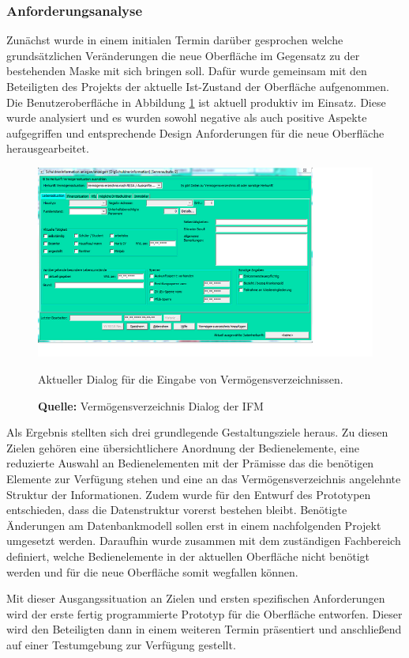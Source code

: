 \subsubsection{Anforderungsanalyse}
Zunächst wurde in einem initialen Termin darüber gesprochen welche grundsätzlichen Veränderungen die neue Oberfläche im Gegensatz zu der bestehenden Maske mit sich bringen soll. Dafür wurde gemeinsam mit den Beteiligten des Projekts der aktuelle Ist-Zustand der Oberfläche aufgenommen. Die Benutzeroberfläche in Abbildung \ref{fig:aktuellerDialog} ist aktuell produktiv im Einsatz. Diese wurde analysiert und es wurden sowohl negative als auch positive Aspekte aufgegriffen und entsprechende Design Anforderungen für die neue Oberfläche herausgearbeitet.
\begin{figure}[H]
  \centering
  \includegraphics[scale=1]{img/aktueller_Dialog.PNG}
  \caption{Aktueller Dialog für die Eingabe von Vermögensverzeichnissen.}
  \caption*{\textbf{Quelle:} Vermögensverzeichnis Dialog der IFM}
  \label{fig:aktuellerDialog}
\end{figure}
Als Ergebnis stellten sich drei grundlegende Gestaltungsziele heraus. Zu diesen Zielen gehören eine übersichtlichere Anordnung der Bedienelemente, eine reduzierte Auswahl an Bedienelementen mit der Prämisse das die benötigen Elemente zur Verfügung stehen und eine an das Vermögensverzeichnis angelehnte Struktur der Informationen. Zudem wurde für den Entwurf des Prototypen entschieden, dass die Datenstruktur vorerst bestehen bleibt. Benötigte Änderungen am Datenbankmodell sollen erst in einem nachfolgenden Projekt umgesetzt werden. Daraufhin wurde zusammen mit dem zuständigen Fachbereich definiert, welche Bedienelemente in der aktuellen Oberfläche nicht benötigt werden und für die neue Oberfläche somit wegfallen können.

Mit dieser Ausgangssituation an Zielen und ersten spezifischen Anforderungen wird der erste fertig programmierte Prototyp für die Oberfläche entworfen. Dieser wird den Beteiligten dann in einem weiteren Termin präsentiert und anschließend auf einer Testumgebung zur Verfügung gestellt.

